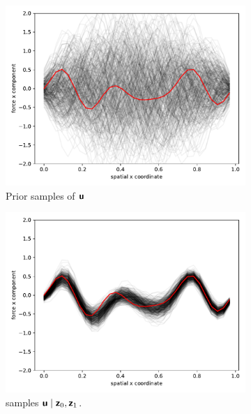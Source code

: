 \begin{figure}[h!t]
    \begin{subfigure}{0.3\textwidth}
        \includegraphics[scale=0.35]{meth_ex_guess_0.pdf}
         \caption{Prior samples of \(\boldsymbol{\mathsf{u}}\)}
         \label{fig:meth_ex_0}
    \end{subfigure}
    \begin{subfigure}{0.3\textwidth}
        \includegraphics[scale=0.35]{meth_ex_guess_1.pdf}
         \caption{\meth{} samples \(\boldsymbol{\mathsf{u}}\mid \boldsymbol{\mathsf{z}}_0,\boldsymbol{\mathsf{z}}_1\).}
         \label{fig:meth_ex_1}
    \end{subfigure}
    \begin{subfigure}{0.3\textwidth}

\end{subfigure}
\end{figure}
